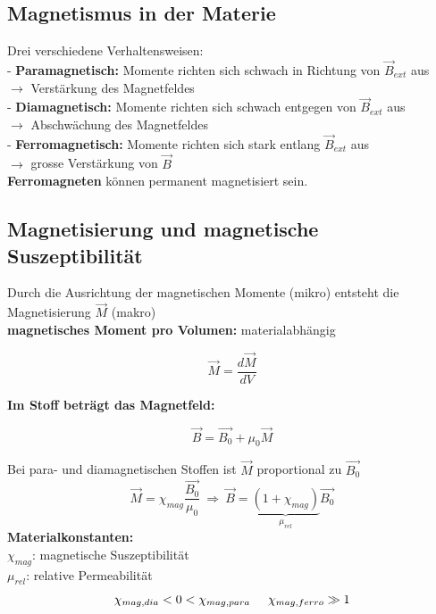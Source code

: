 \subsection{Magnetismus in der Materie}
Drei verschiedene Verhaltensweisen: \\[1ex]
- \textbf{Paramagnetisch:} Momente richten sich schwach in Richtung von $\vec{B}_{ext}$ aus\\
\hspace{5mm} $\rightarrow$ Verstärkung des Magnetfeldes \\
- \textbf{Diamagnetisch:} Momente richten sich schwach entgegen von $\vec{B}_{ext}$ aus \\
\hspace{5mm} $\rightarrow$ Abschwächung des Magnetfeldes \\
- \textbf{Ferromagnetisch:} Momente richten sich stark entlang $\vec{B}_{ext}$ aus \\
\hspace{5mm} $\rightarrow$ grosse Verstärkung von $\vec{B}$ \\[1ex]
\textbf{Ferromagneten} können permanent magnetisiert sein. \\[2ex]

\subsection{Magnetisierung und magnetische Suszeptibilität}
Durch die Ausrichtung der magnetischen Momente (mikro) entsteht die Magnetisierung $\vec{M}$ (makro)\\[1ex]
\textbf{magnetisches Moment pro Volumen:} materialabhängig
\begin{formulabox}
    \[
        \vec{M} = \frac{d\vec{M}}{dV}
    \]
\end{formulabox}
\textbf{Im Stoff beträgt das Magnetfeld:}
\begin{formulabox}
    \[
        \vec{B} = \vec{B_0} + \mu_0\vec{M}
    \]
\end{formulabox}
Bei para- und diamagnetischen Stoffen ist $\vec{M}$ proportional zu $\vec{B_0}$
\[
    \vec{M} = \chi_{mag}\frac{\vec{B_0}}{\mu_0} \ \Rightarrow \ \vec{B} = \underbrace{\left( 1 + \chi_{mag} \right)}_{\mu_{rel}}\vec{B_0}
\]
\textbf{Materialkonstanten:} \\
\hspace{5mm} $\chi_{mag}$: magnetische Suszeptibilität\\
\hspace{5mm} $\mu_{rel}$: relative Permeabilität
\[
\chi_{mag,dia} < 0 < \chi_{mag,para} \hspace{5mm} \chi_{mag,ferro} \gg 1
\]
